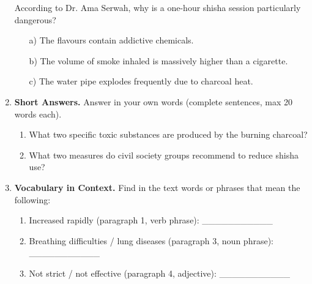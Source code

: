 \documentclass[11pt]{article}
\begin{document}
\begin{exercice}
\begin{enumerate}
    According to Dr. Ama Serwah, why is a one-hour shisha session particularly dangerous?
    \begin{itemize}
        \item[a)] The flavours contain addictive chemicals.
        \item[b)] The volume of smoke inhaled is massively higher than a cigarette.
        \item[c)] The water pipe explodes frequently due to charcoal heat.
    \end{itemize}
    \item \textbf{Short Answers.} Answer in your own words (complete sentences, max 20 words each).
    \begin{enumerate}
        \item What two specific toxic substances are produced by the burning charcoal?
        \item What two measures do civil society groups recommend to reduce shisha use?
    \end{enumerate}
    \item \textbf{Vocabulary in Context.} Find in the text words or phrases that mean the following:
    \begin{enumerate}
        \item Increased rapidly (paragraph 1, verb phrase): \_\_\_\_\_\_\_\_\_\_\_
        \item Breathing difficulties / lung diseases (paragraph 3, noun phrase): \_\_\_\_\_\_\_\_\_\_\_
        \item Not strict / not effective (paragraph 4, adjective): \_\_\_\_\_\_\_\_\_\_\_
    \end{enumerate}
\end{enumerate}
\end{exercice}
\end{document}
